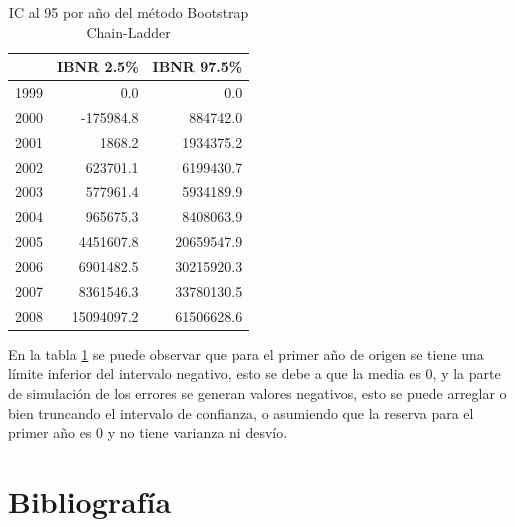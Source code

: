 \documentclass[
  12pt,
]{article}
\begin{document}
\begin{table}[ht]
\centering
\caption{IC al 95 por año del método Bootstrap Chain-Ladder} 
\label{quantile_boot}
\begin{tabular}{lrr}
  \hline
 & IBNR 2.5\% & IBNR 97.5\% \\ 
  \hline
1999 & 0.0 & 0.0 \\ 
  2000 & -175984.8 & 884742.0 \\ 
  2001 & 1868.2 & 1934375.2 \\ 
  2002 & 623701.1 & 6199430.7 \\ 
  2003 & 577961.4 & 5934189.9 \\ 
  2004 & 965675.3 & 8408063.9 \\ 
  2005 & 4451607.8 & 20659547.9 \\ 
  2006 & 6901482.5 & 30215920.3 \\ 
  2007 & 8361546.3 & 33780130.5 \\ 
  2008 & 15094097.2 & 61506628.6 \\ 
   \hline
\end{tabular}
\end{table}

En la tabla \ref{quantile_boot} se puede observar que para el primer año
de origen se tiene una límite inferior del intervalo negativo, esto se
debe a que la media es 0, y la parte de simulación de los errores se
generan valores negativos, esto se puede arreglar o bien truncando el
intervalo de confianza, o asumiendo que la reserva para el primer año es
0 y no tiene varianza ni desvío.

\newpage

\hypertarget{bib}{%
\section*{Bibliografía}\label{bib}}
\end{document}
